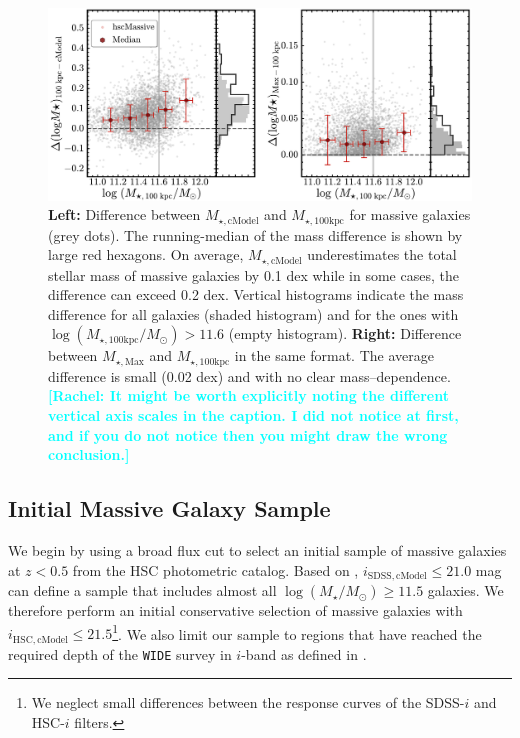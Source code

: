 \documentclass[a4paper,fleqn,usenatbib]{mnras}
\def\logms{{$\log (M_{\star}/M_{\odot})$}}
\def\mtot{{$M_{\star,100\mathrm{kpc}}$}}
\def\mmax{{$M_{\star,\mathrm{Max}}$}}
\def\mcmodel{{$M_{\star,\mathrm{cModel}}$}}
\def\logmtot{{$\log (M_{\star,100\mathrm{kpc}}/M_{\odot})$}}
\newcommand{\rachel}[1]{\textcolor{cyan}{\textbf{[Rachel: #1]}}}
\begin{document}
  \begin{figure}
      \centering 
      \includegraphics[width=\textwidth]{fig/redbcg_mass_diff_new}
      \caption{              
          \textbf{Left:} Difference between \mcmodel{} and \mtot{} for massive
      	  galaxies (grey dots).
      	  The running-median of the mass difference is shown by large red hexagons. On average, \mcmodel{} underestimates the total stellar mass of massive 
          galaxies by 0.1 dex while in some cases, the difference can exceed 0.2 dex.
          Vertical histograms indicate the mass difference for all galaxies (shaded 
          histogram) and for the ones with \logmtot{}$>11.6$ (empty histogram).
          \textbf{Right:} Difference between \mmax{} and \mtot{} in the same format. 
          The average difference is small (0.02 dex) and with no clear mass--dependence. \rachel{It might be worth explicitly noting the different vertical axis scales in the caption.  I did not notice at first, and if you do not notice then you might draw the wrong conclusion.}}
      \label{fig:mass_diff}
  \end{figure}
          
    
\subsection{Initial Massive Galaxy Sample}
    \label{ssec:initial}
    
    We begin by using a broad flux cut to select an initial sample of massive 
    galaxies at $z < 0.5$ from the HSC photometric catalog. 
    Based on \citet{Leauthaud2016}, $i_{\mathrm{SDSS, cModel}} \leq 21.0$ mag can 
    define a sample that includes almost all \logms{}$\geq 11.5$ galaxies.    
    We therefore perform an initial conservative selection of massive galaxies
    with $i_{\mathrm{HSC, cModel}} \leq 21.5$\footnote{We neglect small differences
    between the response curves of the SDSS-$i$ and HSC-$i$ filters.}. 
    We also limit our sample to regions that have reached the required depth of 
    the \texttt{WIDE} survey in $i$-band as defined in \citet{HSC_DR1}.
    
\end{document}
